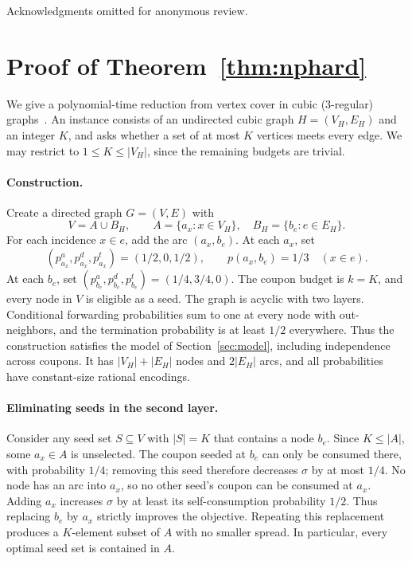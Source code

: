 \documentclass[sigconf]{acmart}
\begin{document}
\begin{acks}
Acknowledgments omitted for anonymous review.
\end{acks}





\appendix
\section{Proof of Theorem~\ref{thm:nphard}}
\label{app:hardness}

We give a polynomial-time reduction from vertex cover in cubic
(3-regular) graphs~\cite{garey1976simplified}. An instance consists of
an undirected cubic graph $H=(V_H,E_H)$ and an integer $K$, and asks
whether a set of at most $K$ vertices meets every edge. We may restrict
to $1\leq K\leq |V_H|$, since the remaining budgets are trivial.

\paragraph{Construction.}
Create a directed graph $G=(V,E)$ with
\[
  V=A\cup B_H,\qquad
  A=\{a_x:x\in V_H\},\quad B_H=\{b_e:e\in E_H\}.
\]
For each incidence $x\in e$, add the arc $(a_x,b_e)$.
At each $a_x$, set
\[
  (p_{a_x}^a,p_{a_x}^d,p_{a_x}^t)=(1/2,0,1/2),
  \qquad p(a_x,b_e)=1/3\quad(x\in e).
\]
At each $b_e$, set
$(p_{b_e}^a,p_{b_e}^d,p_{b_e}^t)=(1/4,3/4,0)$.
The coupon budget is $k=K$, and every node in $V$ is eligible as a
seed. The graph is acyclic with two layers. Conditional forwarding
probabilities sum to one at every node with out-neighbors, and the
termination probability is at least $1/2$ everywhere. Thus the
construction satisfies the model of Section~\ref{sec:model}, including
independence across coupons. It has $|V_H|+|E_H|$ nodes and $2|E_H|$
arcs, and all probabilities have constant-size rational encodings.

\paragraph{Eliminating seeds in the second layer.}
Consider any seed set $S\subseteq V$ with $|S|=K$ that contains a node
$b_e$. Since $K\leq |A|$, some $a_x\in A$ is unselected. The coupon
seeded at $b_e$ can only be consumed there, with probability $1/4$;
removing this seed therefore decreases $\sigma$ by at most $1/4$.
No node has an arc into $a_x$, so no other seed's coupon can be
consumed at $a_x$. Adding $a_x$ increases $\sigma$ by at least its
self-consumption probability $1/2$. Thus replacing $b_e$ by $a_x$
strictly improves the objective. Repeating this replacement produces
a $K$-element subset of $A$ with no smaller spread. In particular,
every optimal seed set is contained in $A$.
\end{document}
